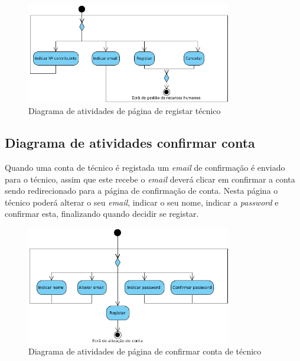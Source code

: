 \begin{figure}[htb]
    \centering
    \includegraphics[width=0.8\textwidth]{images/diagramas/atividades/diagrama_atividades_add_professional.png}
    \caption{Diagrama de atividades de página de registar técnico}
    \label{fig:31}
\end{figure}

\subsection{Diagrama de atividades confirmar conta}

Quando uma conta de técnico é registada um \textit{email} de confirmação é enviado para o técnico, assim que este
recebe o \textit{email} deverá clicar em confirmar a conta sendo redirecionado para a página de confirmação de conta.
Nesta página o técnico poderá alterar o seu \textit{email}, indicar o seu nome, indicar a \textit{password} e confirmar esta, 
finalizando quando decidir se registar.

\begin{figure}[htb]
    \centering
    \includegraphics[width=0.8\textwidth]{images/diagramas/atividades/diagrama_atividades_prof_register.png}
    \caption{Diagrama de atividades de página de confirmar conta de técnico}
    \label{fig:31}
\end{figure}